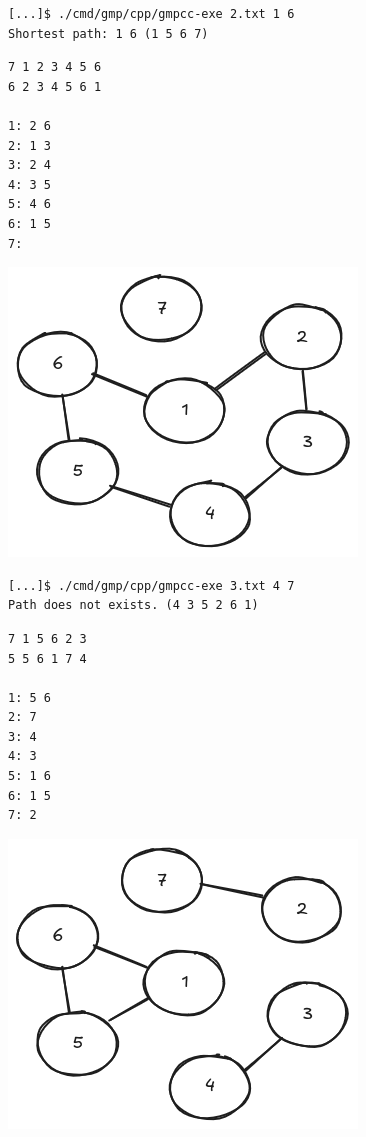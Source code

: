 \documentclass[12pt, a4paper]{article}
\begin{document}
\begin{verbatim}
[...]$ ./cmd/gmp/cpp/gmpcc-exe 2.txt 1 6
Shortest path: 1 6 (1 5 6 7)
\end{verbatim}

\vspace{5mm}

\begin{multicols}{2}
\begin{verbatim}
7 1 2 3 4 5 6
6 2 3 4 5 6 1

1: 2 6
2: 1 3
3: 2 4
4: 3 5
5: 4 6
6: 1 5
7: 
\end{verbatim}

\columnbreak

\includegraphics[scale=0.5]{3.png}
\end{multicols}

\begin{verbatim}
[...]$ ./cmd/gmp/cpp/gmpcc-exe 3.txt 4 7
Path does not exists. (4 3 5 2 6 1)
\end{verbatim}

\vspace{5mm}

\begin{multicols}{2}
\begin{verbatim}
7 1 5 6 2 3
5 5 6 1 7 4

1: 5 6
2: 7
3: 4
4: 3
5: 1 6
6: 1 5
7: 2
\end{verbatim}

\columnbreak

\includegraphics[scale=0.5]{4.png}
\end{multicols}
\end{document}
